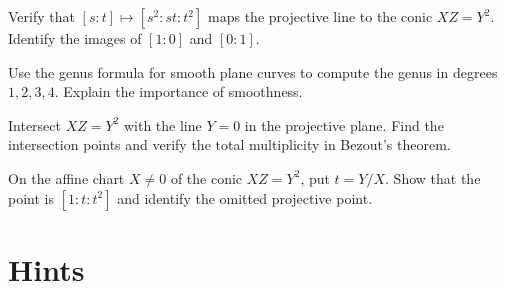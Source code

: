 \begin{exercise}[$\star$]\label{ex:v13-extra-14-1}
Verify that $[s:t]\mapsto[s^2:st:t^2]$ maps the projective line to the conic $XZ=Y^2$. Identify the images of $[1:0]$ and $[0:1]$.
\end{exercise}

\begin{exercise}[$\star$]\label{ex:v13-extra-14-2}
Use the genus formula for smooth plane curves to compute the genus in degrees $1,2,3,4$. Explain the importance of smoothness.
\end{exercise}

\begin{exercise}[$\star\star$]\label{ex:v13-extra-14-3}
Intersect $XZ=Y^2$ with the line $Y=0$ in the projective plane. Find the intersection points and verify the total multiplicity in Bezout's theorem.
\end{exercise}

\begin{exercise}[$\star$]\label{ex:v13-extra-14-4}
On the affine chart $X\ne0$ of the conic $XZ=Y^2$, put $t=Y/X$. Show that the point is $[1:t:t^2]$ and identify the omitted projective point.
\end{exercise}

\section{Hints}

